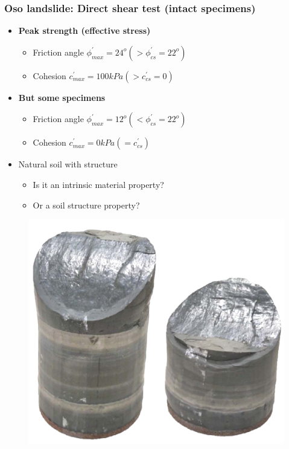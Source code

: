 \documentclass[notes]{beamer}
\begin{document}
\begin{frame}
	\frametitle{Oso landslide: Direct shear test (intact specimens)}
	\noindent
	\fboxsep=0pt
	\noindent
	\begin{minipage}[t]{0.65\linewidth}
		\begin{itemize}
			\item \textbf{Peak strength (effective stress)}
			\begin{itemize}
				\item Friction angle $\phi^\prime_{max} = 24^o (> \phi^\prime_{cs} = 22^o)$
				\item Cohesion $c^\prime_{max} = 100 kPa (> c^\prime_{cs} = 0)$
			\end{itemize}
				\item \textbf{But some specimens}
			\begin{itemize}
				\item Friction angle $\phi^\prime_{max} = 12^o (< \phi^\prime_{cs} = 22^o)$
				\item Cohesion $c^\prime_{max} = 0 kPa ( = c^\prime_{cs})$
			\end{itemize}
			\item Natural soil with structure
			\begin{itemize}
				\item Is it an intrinsic material property?
				\item Or a soil structure property?
			\end{itemize}
		\end{itemize}
		
	\end{minipage}%
	\hfill
	\begin{minipage}[t]{0.35\linewidth}
	\begin{figure}
		\includegraphics[width=\textwidth]{figs/oso/direct-shear-test.png}
	\end{figure}
	\end{minipage}	
\end{frame}
\end{document}
